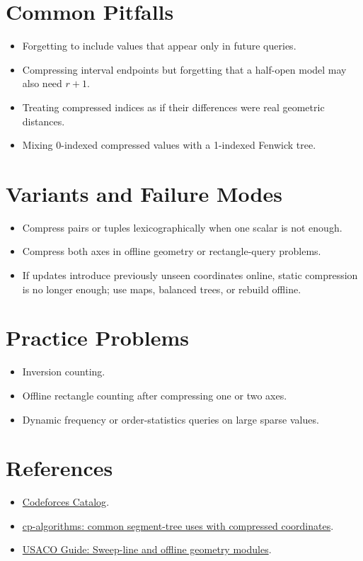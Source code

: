 \section*{Common Pitfalls}

\begin{itemize}
  \item Forgetting to include values that appear only in future queries.
  \item Compressing interval endpoints but forgetting that a half-open model may also need \(r+1\).
  \item Treating compressed indices as if their differences were real geometric distances.
  \item Mixing 0-indexed compressed values with a 1-indexed Fenwick tree.
\end{itemize}

\section*{Variants and Failure Modes}

\begin{itemize}
  \item Compress pairs or tuples lexicographically when one scalar is not enough.
  \item Compress both axes in offline geometry or rectangle-query problems.
  \item If updates introduce previously unseen coordinates online, static compression is no longer enough; use maps,
  balanced trees, or rebuild offline.
\end{itemize}

\section*{Practice Problems}

\begin{itemize}
  \item Inversion counting.
  \item Offline rectangle counting after compressing one or two axes.
  \item Dynamic frequency or order-statistics queries on large sparse values.
\end{itemize}

\section*{References}

\begin{itemize}
  \item \href{https://codeforces.com/catalog}{Codeforces Catalog}.
  \item \href{https://cp-algorithms.com/data_structures/segment_tree.html}{cp-algorithms: common segment-tree uses with compressed coordinates}.
  \item \href{https://usaco.guide/plat/sweep-line}{USACO Guide: Sweep-line and offline geometry modules}.
\end{itemize}
